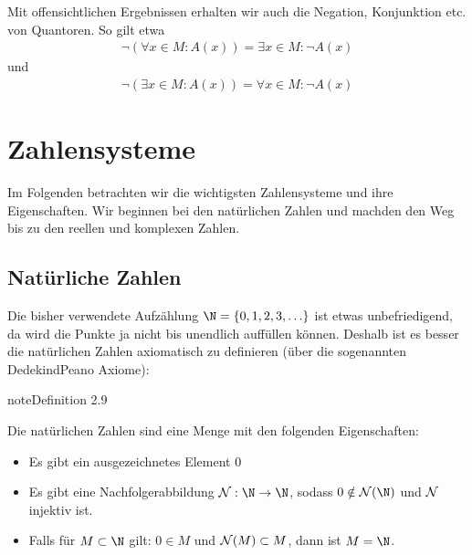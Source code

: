 \documentclass[letterpaper,10pt,english]{jupyterBook}
\begin{document}
Mit offensichtlichen Ergebnissen erhalten wir auch die Negation, Konjunktion etc. von Quantoren. So gilt etwa
\begin{equation*}
\begin{split}\lnot( \forall x \in M: A(x) ) = \exists x \in M: \lnot A(x)\end{split}
\end{equation*}
und
\begin{equation*}
\begin{split}\lnot( \exists x \in M: A(x) ) = \forall x \in M: \lnot A(x)\end{split}
\end{equation*}

\section{Zahlensysteme}
\label{\detokenize{grundlagen/zahlensysteme:zahlensysteme}}\label{\detokenize{grundlagen/zahlensysteme::doc}}
Im Folgenden betrachten wir die wichtigsten Zahlensysteme und ihre Eigenschaften. Wir beginnen bei den natürlichen Zahlen und machden den Weg bis zu den reellen und komplexen Zahlen.


\subsection{Natürliche Zahlen}
\label{\detokenize{grundlagen/zahlensysteme:naturliche-zahlen}}
Die bisher verwendete Aufzählung \(\N = \{0,1,2,3,\ldots\}\) ist etwas unbefriedigend, da wird die Punkte ja nicht bis unendlich auffüllen können. Deshalb ist es besser die natürlichen Zahlen axiomatisch zu definieren (über die sogenannten Dedekind\sphinxhyphen{}Peano Axiome):
\label{grundlagen/zahlensysteme:definition-0}
\begin{sphinxadmonition}{note}{Definition 2.9}



Die natürlichen Zahlen sind eine Menge mit den folgenden Eigenschaften:
\begin{itemize}
\item {} 
Es gibt ein ausgezeichnetes Element \(0\)

\item {} 
Es gibt eine Nachfolgerabbildung \({\cal N}:\N \rightarrow \N\), sodass \(0 \notin {\cal N}(\N)\) und \({\cal N}\) injektiv ist.

\item {} 
Falls für \(M \subset \N\) gilt: \(0 \in M\) und \({\cal N}(M) \subset M\), dann ist \(M=\N\).

\end{itemize}
\end{sphinxadmonition}
\end{document}
